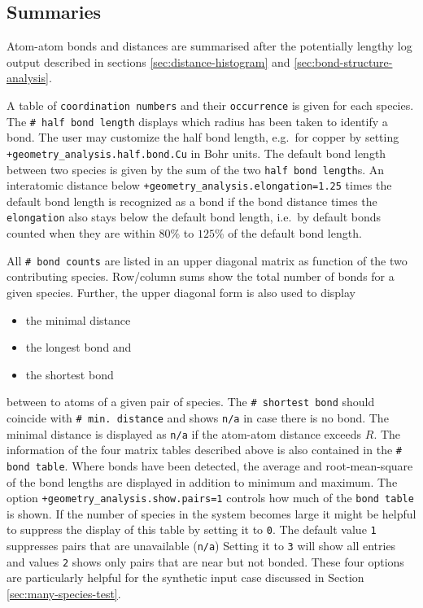 \documentclass[oribibl]{llncs}
\newcommand{\ttt}[1]{\texttt{#1}}
\begin{document}
\subsection{Summaries}
%
Atom-atom bonds and distances are summarised after the potentially lengthy log output described in
sections \ref{sec:distance-histogram} and \ref{sec:bond-structure-analysis}.

\noindent
A table of \ttt{coordination numbers} and their \ttt{occurrence} is given for each species.
The \ttt{\# half bond length} displays which radius has been taken to identify a bond.
The user may customize the half bond length, e.g.~for copper 
by setting \ttt{+geometry\_analysis.half.bond.Cu} in Bohr units.
The default bond length between two species is given by the sum of
the two \ttt{half bond length}s.
An interatomic distance below \ttt{+geometry\_analysis.elongation=1.25} 
times the default bond length is recognized as a bond
if the bond distance times the \ttt{elongation} also stays below the default bond length,
i.e.~by default bonds counted when they are within $80\%$ to $125\%$ of the default bond length.
%

\noindent
All \ttt{\# bond counts} are listed in an upper diagonal matrix as function of the two
contributing species. Row/column sums show the total number of bonds for a given species.
Further, the upper diagonal form is also used to display
\begin{itemize}
	\item the minimal distance
	\item the longest bond and
	\item the shortest bond
\end{itemize}
between to atoms of a given pair of species.
The \ttt{\# shortest bond} should coincide with \ttt{\# min. distance}
and shows \ttt{n/a} in case there is no bond.
The minimal distance is displayed as \ttt{n/a} if the atom-atom distance exceeds $R$.
%
The information of the four matrix tables described above
is also contained in the \ttt{\# bond table}.
Where bonds have been detected, 
the average and root-mean-square of the bond lengths are displayed
in addition to minimum and maximum.
The option \ttt{+geometry\_analysis.show.pairs=1} controls how much of the \ttt{bond table} is shown.
If the number of species in the system becomes large it might be helpful
to suppress the display of this table by setting it to \ttt{0}.
The default value \ttt{1} suppresses pairs that are unavailable (\ttt{n/a})
Setting it to \ttt{3} will show all entries and values \ttt{2} shows only
pairs that are near but not bonded.
These four options are particularly helpful for the synthetic input case discussed in Section \ref{sec:many-species-test}.
\end{document}
